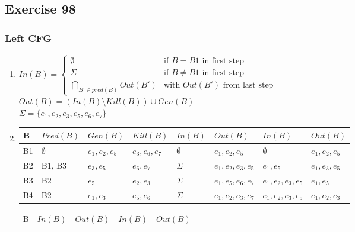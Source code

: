 \documentclass[12pt,fleqn]{article}		%
\begin{document}
\begin{enumerate}
\end{enumerate}

\subsection{Exercise 98}
\subsubsection{Left CFG}
\begin{enumerate}
\item $ In(B) = 
\begin{cases} 
\emptyset & \text{if } B=B1 \text{ in first step}\\
\Sigma & \text{if } B\not= B1 \text{ in first step}\\
\bigcap_{B' \in pred(B)} Out(B') & \text{with } Out(B') \text{ from last step}
\end{cases}$\\
$Out(B) = (In(B) \setminus Kill(B)) \cup Gen(B)$\\
$\Sigma = \{e_1, e_2, e_3, e_5, e_6, e_7\}$
\item 
\begin{tabularx}{\textwidth}{| l | X | X | X || X | X || X | X ||}
\hline
B & $Pred(B) $ & $Gen(B)$ & $Kill(B)$ & $In(B)$ & $Out(B)$ & $In(B)$ & $Out(B)$\\
\hline
B1 & $\emptyset$ & $e_1, e_2, e_5$ & $e_3, e_6, e_7$ & $\emptyset$ & $e_1, e_2, e_5$ & $\emptyset$ & $e_1, e_2, e_5$ \\
\hline
B2 & B1, B3 & $e_3, e_5$ & $e_6, e_7$ & $\Sigma$ & $e_1, e_2, e_3, e_5$ & $e_1, e_5$ & $e_1, e_3, e_5$\\
\hline
B3 & B2 & $e_5$ & $e_2, e_3$ & $\Sigma$ & $e_1, e_5, e_6, e_7$ & $e_1, e_2, e_3, e_5$ & $e_1, e_5$\\
\hline
B4 & B2 & $e_1, e_3$ & $e_5, e_6$ & $\Sigma$ & $e_1, e_2, e_3, e_7$ & $e_1, e_2, e_3, e_5$ & $e_1, e_2, e_3$\\
\hline
\end{tabularx}
\begin{tabularx}{\textwidth}{| l || X | X || X | X ||}
\hline
B & $In(B)$ & $Out(B)$ & $In(B)$ & $Out(B)$\\

\end{tabularx}
\end{enumerate}
\end{document}
